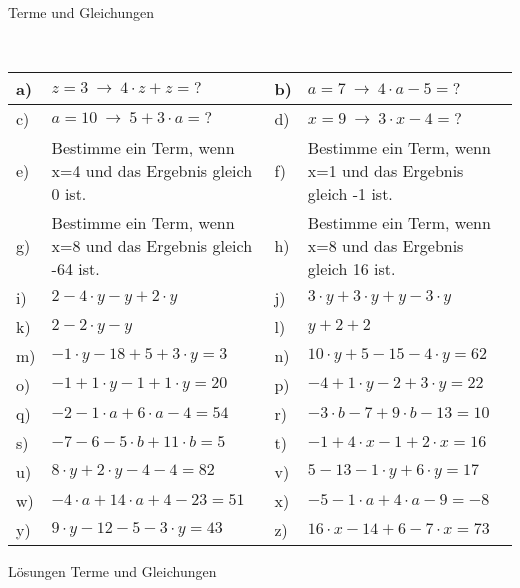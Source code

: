 \documentclass[12pt]{article}
\begin{document}
\centerline{{\Large Terme und Gleichungen}} 
\vspace{1cm}
\noindent \\


\begin{xltabular}{\textwidth}{|C{0.75cm}|X|C{0.75cm}|X|}
\hline
a)& $z=3~ \rightarrow ~ 4 \cdot z + z=?$
&
b)& $a=7~ \rightarrow ~ 4 \cdot a - 5=?$
\\\hline
c)& $a=10~ \rightarrow ~ 5 + 3 \cdot a=?$
&
d)& $x=9~ \rightarrow ~ 3 \cdot x - 4=?$
\\\hline
e)&Bestimme ein Term, wenn x=4 und das Ergebnis gleich 0 ist.
&
f)&Bestimme ein Term, wenn x=1 und das Ergebnis gleich -1 ist.
\\\hline
g)&Bestimme ein Term, wenn x=8 und das Ergebnis gleich -64 ist.
&
h)&Bestimme ein Term, wenn x=8 und das Ergebnis gleich 16 ist.
\\\hline
i)&$2 - 4 \cdot y - y + 2 \cdot y$
&
j)&$3 \cdot y + 3 \cdot y + y - 3 \cdot y$
\\\hline
k)&$2 - 2 \cdot y - y$
&
l)&$y + 2 + 2$
\\\hline
m)&$-1\cdot y-18+5+3\cdot y=3$
&
n)&$10\cdot y+5-15-4\cdot y=62$
\\\hline
o)&$-1+1\cdot y-1+1\cdot y=20$
&
p)&$-4+1\cdot y-2+3\cdot y=22$
\\\hline
q)&$-2-1\cdot a+6\cdot a-4=54$
&
r)&$-3\cdot b-7+9\cdot b-13=10$
\\\hline
s)&$-7-6-5\cdot b+11\cdot b=5$
&
t)&$-1+4\cdot x-1+2\cdot x=16$
\\\hline
u)&$8\cdot y+2\cdot y-4-4=82$
&
v)&$5-13-1\cdot y+6\cdot y=17$
\\\hline
w)&$-4\cdot a+14\cdot a+4-23=51$
&
x)&$-5-1\cdot a+4\cdot a-9=-8$
\\\hline
y)&$9\cdot y-12-5-3\cdot y=43$
&
z)&$16\cdot x-14+6-7\cdot x=73$
\\\hline
\end{xltabular}
\vspace{0.5cm}
\newpage
{}
\centerline{{\large Lösungen Terme und Gleichungen}} 
\vspace{0.5cm}
\end{document}
